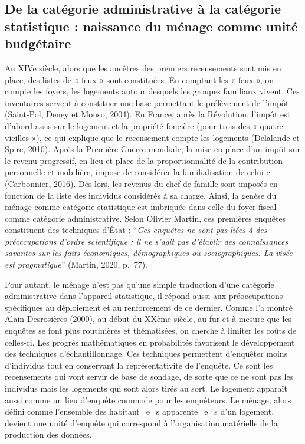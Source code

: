 \documentclass[
  12pt,
]{book}
\begin{document}
\subsection{De la catégorie administrative à la catégorie statistique :
naissance du ménage comme unité
budgétaire}\label{de-la-catuxe9gorie-administrative-uxe0-la-catuxe9gorie-statistique-naissance-du-muxe9nage-comme-unituxe9-budguxe9taire}

Au XIVe siècle, alors que les ancêtres des premiers recensements sont
mis en place, des listes de « feux » sont constituées. En comptant les «
feux », on compte les foyers, les logements autour desquels les groupes
familiaux vivent. Ces inventaires servent à constituer une base
permettant le prélèvement de l'impôt (Saint-Pol, Deney et Monso, 2004).
En France, après la Révolution, l'impôt est d'abord assis sur le
logement et la propriété foncière (pour trois des « quatre vieilles »),
ce qui explique que le recensement compte les logements (Delalande et
Spire, 2010). Après la Première Guerre mondiale, la mise en place d'un
impôt sur le revenu progressif, en lieu et place de la proportionnalité
de la contribution personnelle et mobilière, impose de considérer la
familialisation de celui-ci (Carbonnier, 2016). Dès lors, les revenus du
chef de famille sont imposés en fonction de la liste des individus
considérés à sa charge. Ainsi, la genèse du ménage comme catégorie
statistique est imbriquée dans celle du foyer fiscal comme catégorie
administrative. Selon Olivier Martin, ces premières enquêtes constituent
des techniques d'État : ``\emph{Ces enquêtes ne sont pas liées à des
préoccupations d'ordre scientifique : il ne s'agit pas d'établir des
connaissances savantes sur les faits économiques, démographiques ou
sociographiques. La visée est pragmatique}'' (Martin, 2020, p.~77).

Pour autant, le ménage n'est pas qu'une simple traduction d'une
catégorie administrative dans l'appareil statistique, il répond aussi
aux préoccupations spécifiques au déploiement et au renforcement de ce
dernier. Comme l'a montré Alain Desrosières (2000), au début du XXème
siècle, au fur et à mesure que les enquêtes se font plus routinières et
thématisées, on cherche à limiter les coûts de celles-ci. Les progrès
mathématiques en probabilités favorisent le développement des techniques
d'échantillonnage. Ces techniques permettent d'enquêter moins
d'individus tout en conservant la représentativité de l'enquête. Ce sont
les recensements qui vont servir de base de sondage, de sorte que ce ne
sont pas les individus mais les logements qui sont alors tirés au sort.
Le logement apparaît aussi comme un lieu d'enquête commode pour les
enquêteurs. Le ménage, alors défini comme l'ensemble des habitant·e·s
apparenté·e·s d'un logement, devient une unité d'enquête qui correspond
à l'organisation matérielle de la production des données.
\end{document}
